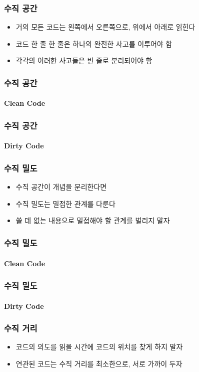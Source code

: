 \documentclass{beamer}
\begin{document}
\begin{frame}
    \frametitle{수직 공간}
    \begin{itemize}
        \item 거의 모든 코드는 왼쪽에서 오른쪽으로, 위에서 아래로 읽힌다
        \item 코드 한 줄 한 줄은 하나의 완전한 사고를 이루어야 함
        \item 각각의 이러한 사고들은 빈 줄로 분리되어야 함
    \end{itemize}
\end{frame}

\begin{frame}
    \frametitle{수직 공간}
    \framesubtitle{Clean Code}
    
\end{frame}

\begin{frame}
    \frametitle{수직 공간}
    \framesubtitle{Dirty Code}
    
\end{frame}

\begin{frame}
    \frametitle{수직 밀도}
    \begin{itemize}
        \item 수직 공간이 개념을 분리한다면
        \item 수직 밀도는 밀접한 관계를 다룬다
        \item 쓸 데 없는 내용으로 밀접해야 할 관계를 벌리지 말자
    \end{itemize}
\end{frame}

\begin{frame}
    \frametitle{수직 밀도}
    \framesubtitle{Clean Code}
    
\end{frame}

\begin{frame}
    \frametitle{수직 밀도}
    \framesubtitle{Dirty Code}
    
\end{frame}

\begin{frame}
    \frametitle{수직 거리}
    \begin{itemize}
        \item 코드의 의도를 읽을 시간에 코드의 위치를 찾게 하지 말자
        \item 연관된 코드는 수직 거리를 최소한으로, 서로 가까이 두자
    \end{itemize}
\end{frame}
\end{document}
